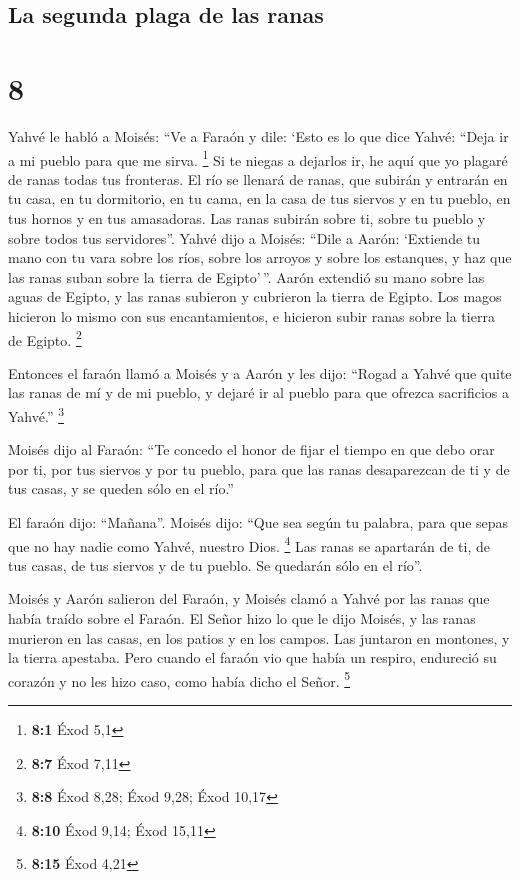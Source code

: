 \hypertarget{la-segunda-plaga-de-las-ranas}{%
\subsection{La segunda plaga de las
ranas}\label{la-segunda-plaga-de-las-ranas}}

\hypertarget{section-7}{%
\section{8}\label{section-7}}

 Yahvé le habló a Moisés: ``Ve a Faraón y dile: `Esto es
lo que dice Yahvé: ``Deja ir a mi pueblo para que me sirva. \footnote{\textbf{8:1}
  Éxod 5,1}  Si te niegas a dejarlos ir, he aquí que yo
plagaré de ranas todas tus fronteras.  El río se llenará
de ranas, que subirán y entrarán en tu casa, en tu dormitorio, en tu
cama, en la casa de tus siervos y en tu pueblo, en tus hornos y en tus
amasadoras.  Las ranas subirán sobre ti, sobre tu pueblo y
sobre todos tus servidores''.  Yahvé dijo a Moisés: ``Dile
a Aarón: `Extiende tu mano con tu vara sobre los ríos, sobre los arroyos
y sobre los estanques, y haz que las ranas suban sobre la tierra de
Egipto'\,''.  Aarón extendió su mano sobre las aguas de
Egipto, y las ranas subieron y cubrieron la tierra de Egipto.
 Los magos hicieron lo mismo con sus encantamientos, e
hicieron subir ranas sobre la tierra de Egipto. \footnote{\textbf{8:7}
  Éxod 7,11}

 Entonces el faraón llamó a Moisés y a Aarón y les dijo:
``Rogad a Yahvé que quite las ranas de mí y de mi pueblo, y dejaré ir al
pueblo para que ofrezca sacrificios a Yahvé.'' \footnote{\textbf{8:8}
  Éxod 8,28; Éxod 9,28; Éxod 10,17}

 Moisés dijo al Faraón: ``Te concedo el honor de fijar el
tiempo en que debo orar por ti, por tus siervos y por tu pueblo, para
que las ranas desaparezcan de ti y de tus casas, y se queden sólo en el
río.''

 El faraón dijo: ``Mañana''. Moisés dijo: ``Que sea según
tu palabra, para que sepas que no hay nadie como Yahvé, nuestro Dios.
\footnote{\textbf{8:10} Éxod 9,14; Éxod 15,11}  Las ranas
se apartarán de ti, de tus casas, de tus siervos y de tu pueblo. Se
quedarán sólo en el río''.

 Moisés y Aarón salieron del Faraón, y Moisés clamó a
Yahvé por las ranas que había traído sobre el Faraón.  El
Señor hizo lo que le dijo Moisés, y las ranas murieron en las casas, en
los patios y en los campos.  Las juntaron en montones, y
la tierra apestaba.  Pero cuando el faraón vio que había
un respiro, endureció su corazón y no les hizo caso, como había dicho el
Señor. \footnote{\textbf{8:15} Éxod 4,21}

